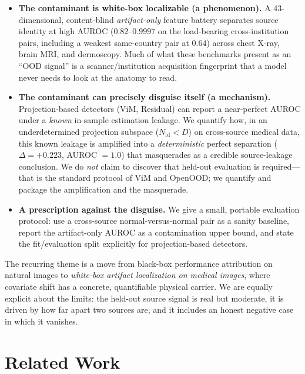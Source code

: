\documentclass{article}
\begin{document}
\begin{itemize}
  \item \textbf{The contaminant is white-box localizable (a phenomenon).} A
  43-dimensional, content-blind \emph{artifact-only} feature battery separates
  source identity at high AUROC ($0.82$--$0.9997$ on the load-bearing
  cross-institution pairs, including a weakest same-country pair at $0.64$)
  across chest X-ray, brain MRI, and dermoscopy. Much of what these benchmarks
  present as an ``OOD signal'' is a scanner/institution acquisition fingerprint
  that a model never needs to look at the anatomy to read.
  \item \textbf{The contaminant can precisely disguise itself (a mechanism).}
  Projection-based detectors (ViM, Residual) can report a near-perfect AUROC
  under a \emph{known} in-sample estimation leakage. We quantify how, in an
  underdetermined projection subspace ($N_\text{id} < D$) on cross-source
  medical data, this known leakage is amplified into a \emph{deterministic}
  perfect separation ($\Delta = +0.223$, AUROC $=1.0$) that masquerades as a
  credible source-leakage conclusion. We do \emph{not} claim to discover that
  held-out evaluation is required---that is the standard protocol of ViM and
  OpenOOD; we quantify and package the amplification and the masquerade.
  \item \textbf{A prescription against the disguise.} We give a small,
  portable evaluation protocol: use a cross-source normal-versus-normal pair as
  a sanity baseline, report the artifact-only AUROC as a contamination upper
  bound, and state the fit/evaluation split explicitly for projection-based
  detectors.
\end{itemize}

The recurring theme is a move from black-box performance attribution on natural
images to \emph{white-box artifact localization on medical images}, where
covariate shift has a concrete, quantifiable physical carrier. We are equally
explicit about the limits: the held-out source signal is real but moderate, it
is driven by how far apart two sources are, and it includes an honest negative
case in which it vanishes.

\section{Related Work}
\end{document}
